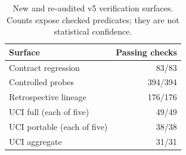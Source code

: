\begin{table}[t]
\centering
\small
\begin{tabular}{lr}
\hline
Surface & Passing checks \\
\hline
Contract regression & 83/83 \\
Controlled probes & 394/394 \\
Retrospective lineage & 176/176 \\
UCI full (each of five) & 49/49 \\
UCI portable (each of five) & 38/38 \\
UCI aggregate & 31/31 \\
\hline
\end{tabular}
\caption{New and re-audited v5 verification surfaces. Counts expose checked predicates; they are not statistical confidence.}
\label{tab:v5-verification}
\end{table}
